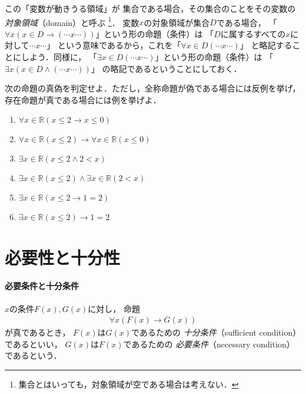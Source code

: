  この「変数が動きうる領域」が
 集合である場合，その集合のことをその変数の
 \emph{対象領域}（domain）と呼ぶ
 \footnote{集合とはいっても，対象領域が空である場合は考えない．}．
 変数$x$の対象領域が集合$D$である場合，
 「$\forall x ( x \in D \to (\cdots x \cdots) )$」という形の命題（条件）は
 「$D$に属するすべての$x$に対して$\cdots x \cdots$」
 という意味であるから，これを「$\forall x \in D ( \cdots x \cdots)$」
 と略記することにしよう．同様に，
 「$\exists x \in D ( \cdots x \cdots )$」という形の命題（条件）は
 「$\exists x ( x \in D \land ( \cdots x \cdots ))$」
 の略記であるということにしておく．
 \begin{que} \label{chp:sequent.sec:hensuu.que:sokubakusingi}
   次の命題の真偽を判定せよ．ただし，全称命題が偽である場合には反例を挙げ，
   存在命題が真である場合には例を挙げよ．
  \begin{enumerate}
     \item $\forall x \in \mathbb{R} ( x \leq 2 \to x \leq 0)$ %
     \item $\forall x \in \mathbb{R} ( x \leq 2 ) %
       \to \forall x \in \mathbb{R} ( x \leq 0)$ %
     \item $\exists x \in \mathbb{R} ( x \leq 2 \land 2 < x)$ %
     \item $\exists x \in \mathbb{R} ( x \leq 2) 
            \land \exists x \in \mathbb{R} ( 2 < x)$ %
     \item $\exists x \in \mathbb{R} ( x \leq 2 \to 1=2)$ %
     \item $\exists x \in \mathbb{R} ( x \leq 2 ) \to 1=2 $ %
   \end{enumerate}
 \end{que}
 \section{必要性と十分性}
 \label{sec:hituyoujubun}

 \paragraph{必要条件と十分条件}
 
 $x$の条件$F(x),  G(x)$に対し，
 命題
 \begin{align}
   \forall x ( F(x) \to G(x))
   \label{eq:FnarabaG}
 \end{align}  
 が真であるとき，
 $F(x)$は$G(x)$であるための
 \emph{十分条件}（sufficient condition）であるといい，
 $G(x)$は$F(x)$であるための
 \emph{必要条件}（necessary condition）であるという．

